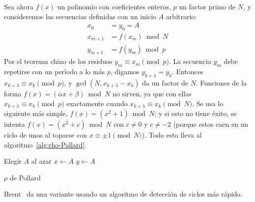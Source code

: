   Sea ahora \(f(x)\) un polinomio con coeficientes enteros,
  \(p\) un factor primo de \(N\),
  y consideremos las secuencias
  definidas con un inicio \(A\) arbitrario:
  \begin{align*}
    x_0	      &= y_0 = A	\\
    x_{m + 1} &= f(x_m) \bmod N \\
    y_{m + 1} &= f(y_m) \bmod p
  \end{align*}
  Por el teorema chino de los residuos%
  \(y_m \equiv x_m \pmod{p}\).
  La secuencia \(y_m\) debe repetirse con un período a lo más \(p\),
  digamos \(y_{k + \lambda} = y_k\).
  Entonces \(x_{k + \lambda} \equiv x_k \pmod{p}\),
  y \(\gcd(N, x_{k + \lambda} - x_k)\) da un factor de \(N\).
  Funciones de la forma \(f(x) = (\alpha x + \beta) \bmod N\)
  no sirven,
  ya que con ellas \(x_{k + \lambda} \equiv x_k \pmod{p}\)
  exactamente cuando \(x_{k + \lambda} \equiv x_k \pmod{N}\).
  Se usa lo siguiente más simple,
  \(f(x) = (x^2 + 1) \bmod N\);
  y si esto no tiene éxito,
  se intenta \(f(x) = (x^2 + c) \bmod N\)
  con \(c \ne 0\) y \(c \ne -2\)
  (porque estos caen en un ciclo de unos
   al toparse con \(x \equiv \pm 1 \pmod{N}\)).
  Todo esto lleva al algoritmo~\ref{alg:rho-Pollard}.
  \begin{algorithm}[htbp]
    \DontPrintSemicolon

    \KwFunction {} \;
    \BlankLine
    Elegir \(A\) al azar \;
    \(x \leftarrow A\) \;
    \(y \leftarrow A\) \;
    \caption{$\rho$ de Pollard}
    \label{alg:rho-Pollard}
  \end{algorithm}
  Brent~\cite{brent80:_improved_rho}
  da una variante usando un algoritmo de detección de ciclos
  más rápido.

